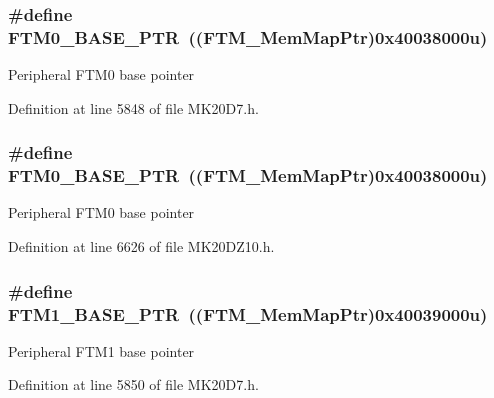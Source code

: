 \subsubsection[{\texorpdfstring{F\+T\+M0\+\_\+\+B\+A\+S\+E\+\_\+\+P\+TR}{FTM0_BASE_PTR}}]{\setlength{\rightskip}{0pt plus 5cm}\#define F\+T\+M0\+\_\+\+B\+A\+S\+E\+\_\+\+P\+TR~(({\bf F\+T\+M\+\_\+\+Mem\+Map\+Ptr})0x40038000u)}\hypertarget{group___f_t_m___peripheral_gae712c29b7abcf338d8f8f6418683fa66}{}\label{group___f_t_m___peripheral_gae712c29b7abcf338d8f8f6418683fa66}
Peripheral F\+T\+M0 base pointer 

Definition at line 5848 of file M\+K20\+D7.\+h.

\subsubsection[{\texorpdfstring{F\+T\+M0\+\_\+\+B\+A\+S\+E\+\_\+\+P\+TR}{FTM0_BASE_PTR}}]{\setlength{\rightskip}{0pt plus 5cm}\#define F\+T\+M0\+\_\+\+B\+A\+S\+E\+\_\+\+P\+TR~(({\bf F\+T\+M\+\_\+\+Mem\+Map\+Ptr})0x40038000u)}\hypertarget{group___f_t_m___peripheral_gae712c29b7abcf338d8f8f6418683fa66}{}\label{group___f_t_m___peripheral_gae712c29b7abcf338d8f8f6418683fa66}
Peripheral F\+T\+M0 base pointer 

Definition at line 6626 of file M\+K20\+D\+Z10.\+h.

\subsubsection[{\texorpdfstring{F\+T\+M1\+\_\+\+B\+A\+S\+E\+\_\+\+P\+TR}{FTM1_BASE_PTR}}]{\setlength{\rightskip}{0pt plus 5cm}\#define F\+T\+M1\+\_\+\+B\+A\+S\+E\+\_\+\+P\+TR~(({\bf F\+T\+M\+\_\+\+Mem\+Map\+Ptr})0x40039000u)}\hypertarget{group___f_t_m___peripheral_ga38115fba8eadfc94b2fc411f45906002}{}\label{group___f_t_m___peripheral_ga38115fba8eadfc94b2fc411f45906002}
Peripheral F\+T\+M1 base pointer 

Definition at line 5850 of file M\+K20\+D7.\+h.

